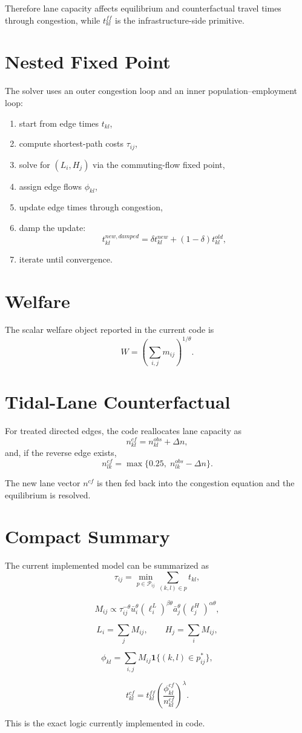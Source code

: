 \documentclass[11pt]{article}
\begin{document}
Therefore lane capacity affects equilibrium and counterfactual travel times through congestion, while $t_{kl}^{ff}$ is the infrastructure-side primitive.

\section{Nested Fixed Point}

The solver uses an outer congestion loop and an inner population--employment loop:

\begin{enumerate}
\item start from edge times $t_{kl}$,
\item compute shortest-path costs $\tau_{ij}$,
\item solve for $(L_i,H_j)$ via the commuting-flow fixed point,
\item assign edge flows $\phi_{kl}$,
\item update edge times through congestion,
\item damp the update:
\[
t_{kl}^{new,damped}
=
\delta t_{kl}^{new} + (1-\delta)t_{kl}^{old},
\]
\item iterate until convergence.
\end{enumerate}

\section{Welfare}

The scalar welfare object reported in the current code is
\[
W = \left( \sum_{i,j} m_{ij} \right)^{1/\theta}.
\]

\section{Tidal-Lane Counterfactual}

For treated directed edges, the code reallocates lane capacity as
\[
n_{kl}^{cf} = n_{kl}^{obs} + \Delta n,
\]
and, if the reverse edge exists,
\[
n_{lk}^{cf} = \max\{0.25,\; n_{lk}^{obs} - \Delta n\}.
\]

The new lane vector $n^{cf}$ is then fed back into the congestion equation and the equilibrium is resolved.

\section{Compact Summary}

The current implemented model can be summarized as
\[
\tau_{ij} = \min_{p \in \mathcal P_{ij}} \sum_{(k,l)\in p} t_{kl},
\]

\[
M_{ij} \propto \tau_{ij}^{-\theta}\bar u_i^\theta(\ell_i^L)^{\beta\theta}\bar a_j^\theta(\ell_j^H)^{\alpha\theta},
\]

\[
L_i = \sum_j M_{ij},
\qquad
H_j = \sum_i M_{ij},
\]

\[
\phi_{kl}
=
\sum_{i,j} M_{ij}\mathbf 1\{(k,l)\in p_{ij}^*\},
\]

\[
t_{kl}^{cf}
=
t_{kl}^{ff}
\left(
\frac{\phi_{kl}^{cf}}{n_{kl}^{cf}}
\right)^{\lambda}.
\]

This is the exact logic currently implemented in code.
\end{document}
